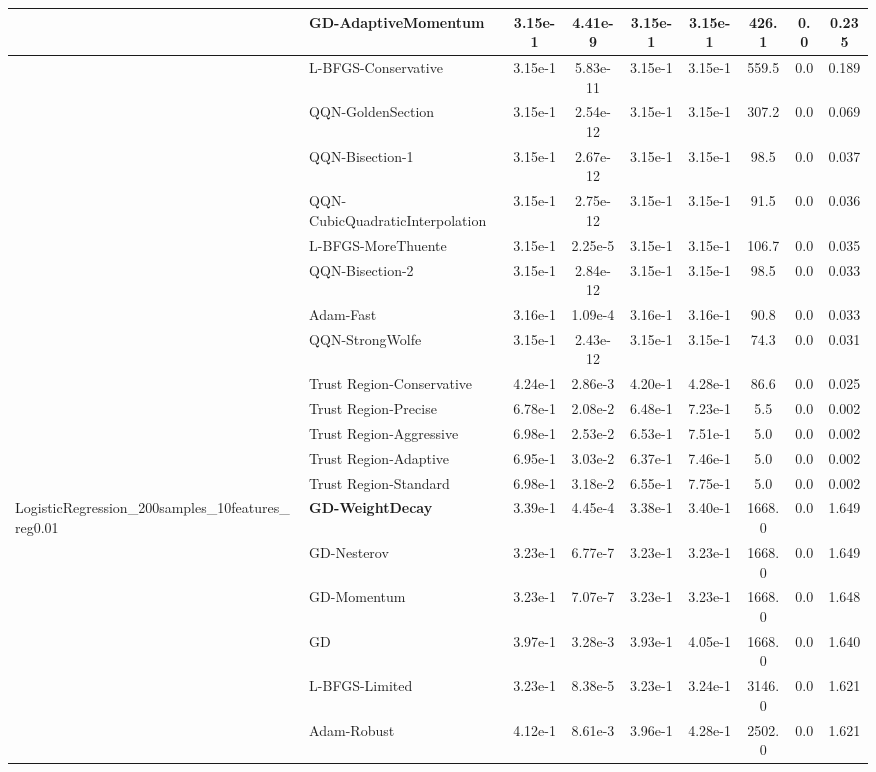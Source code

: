 \documentclass[10pt]{article}
\begin{document}
\begin{longtable}{|l|l|c|c|c|c|c|c|c|}
\hline
 & GD-AdaptiveMomentum & 3.15e-1 & 4.41e-9 & 3.15e-1 & 3.15e-1 & 426.1 & 0.0 & 0.235 \\
\hline
 & L-BFGS-Conservative & 3.15e-1 & 5.83e-11 & 3.15e-1 & 3.15e-1 & 559.5 & 0.0 & 0.189 \\
\hline
 & QQN-GoldenSection & 3.15e-1 & 2.54e-12 & 3.15e-1 & 3.15e-1 & 307.2 & 0.0 & 0.069 \\
\hline
 & QQN-Bisection-1 & 3.15e-1 & 2.67e-12 & 3.15e-1 & 3.15e-1 & 98.5 & 0.0 & 0.037 \\
\hline
 & QQN-CubicQuadraticInterpolation & 3.15e-1 & 2.75e-12 & 3.15e-1 & 3.15e-1 & 91.5 & 0.0 & 0.036 \\
\hline
 & L-BFGS-MoreThuente & 3.15e-1 & 2.25e-5 & 3.15e-1 & 3.15e-1 & 106.7 & 0.0 & 0.035 \\
\hline
 & QQN-Bisection-2 & 3.15e-1 & 2.84e-12 & 3.15e-1 & 3.15e-1 & 98.5 & 0.0 & 0.033 \\
\hline
 & Adam-Fast & 3.16e-1 & 1.09e-4 & 3.16e-1 & 3.16e-1 & 90.8 & 0.0 & 0.033 \\
\hline
 & QQN-StrongWolfe & 3.15e-1 & 2.43e-12 & 3.15e-1 & 3.15e-1 & 74.3 & 0.0 & 0.031 \\
\hline
 & Trust Region-Conservative & 4.24e-1 & 2.86e-3 & 4.20e-1 & 4.28e-1 & 86.6 & 0.0 & 0.025 \\
\hline
 & Trust Region-Precise & 6.78e-1 & 2.08e-2 & 6.48e-1 & 7.23e-1 & 5.5 & 0.0 & 0.002 \\
\hline
 & Trust Region-Aggressive & 6.98e-1 & 2.53e-2 & 6.53e-1 & 7.51e-1 & 5.0 & 0.0 & 0.002 \\
\hline
 & Trust Region-Adaptive & 6.95e-1 & 3.03e-2 & 6.37e-1 & 7.46e-1 & 5.0 & 0.0 & 0.002 \\
\hline
 & Trust Region-Standard & 6.98e-1 & 3.18e-2 & 6.55e-1 & 7.75e-1 & 5.0 & 0.0 & 0.002 \\
LogisticRegression\_200samples\_10features\_reg0.01 & \textbf{GD-WeightDecay} & 3.39e-1 & 4.45e-4 & 3.38e-1 & 3.40e-1 & 1668.0 & 0.0 & 1.649 \\
\hline
 & GD-Nesterov & 3.23e-1 & 6.77e-7 & 3.23e-1 & 3.23e-1 & 1668.0 & 0.0 & 1.649 \\
\hline
 & GD-Momentum & 3.23e-1 & 7.07e-7 & 3.23e-1 & 3.23e-1 & 1668.0 & 0.0 & 1.648 \\
\hline
 & GD & 3.97e-1 & 3.28e-3 & 3.93e-1 & 4.05e-1 & 1668.0 & 0.0 & 1.640 \\
\hline
 & L-BFGS-Limited & 3.23e-1 & 8.38e-5 & 3.23e-1 & 3.24e-1 & 3146.0 & 0.0 & 1.621 \\
\hline
 & Adam-Robust & 4.12e-1 & 8.61e-3 & 3.96e-1 & 4.28e-1 & 2502.0 & 0.0 & 1.621 \\

\end{longtable}
\end{document}
